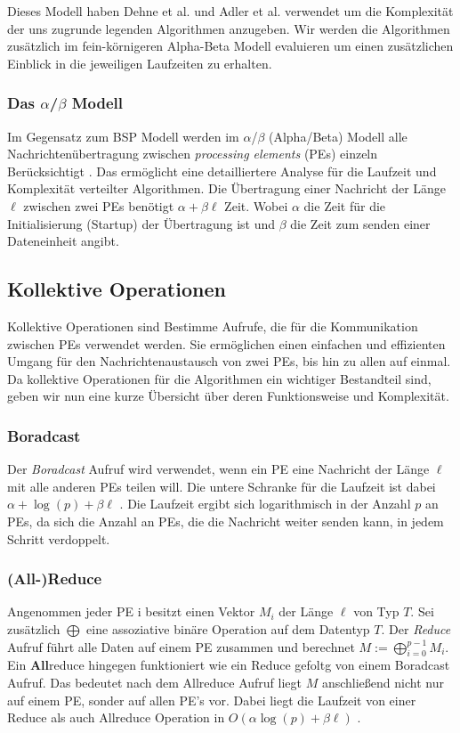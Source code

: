 Dieses Modell haben Dehne et al. \cite{dehne1998practical} und Adler et al. \cite{adler1998communication} verwendet um die Komplexität der uns zugrunde legenden Algorithmen anzugeben. Wir werden die Algorithmen zusätzlich im fein-körnigeren Alpha-Beta Modell evaluieren um einen zusätzlichen Einblick in die jeweiligen Laufzeiten zu erhalten.






\subsubsection{Das \boldmath$\alpha$/$\beta$ Modell}
Im Gegensatz zum BSP Modell werden im $\alpha$/$\beta$ (Alpha/Beta) Modell alle Nachrichtenübertragung zwischen \textit{processing elements} (PEs) einzeln Berücksichtigt \cite{sanders2019sequential}. Das ermöglicht eine detailliertere Analyse für die Laufzeit und Komplexität verteilter Algorithmen.
Die Übertragung einer Nachricht der Länge $\ell$ zwischen zwei PEs benötigt $\alpha + \beta \ell$ Zeit. Wobei $\alpha$ die Zeit für die Initialisierung (Startup) der Übertragung ist und $\beta$ die Zeit zum senden einer Dateneinheit angibt.


\subsection{Kollektive Operationen}
Kollektive Operationen sind Bestimme Aufrufe, die für die Kommunikation zwischen PEs verwendet werden.
Sie ermöglichen einen einfachen und effizienten Umgang für den Nachrichtenaustausch von zwei PEs, bis hin zu allen auf einmal. Da kollektive Operationen für die Algorithmen ein wichtiger Bestandteil sind, geben wir nun eine kurze Übersicht über deren Funktionsweise und Komplexität. 

\subsubsection{Boradcast}
Der \emph{Boradcast} Aufruf wird verwendet, wenn ein PE eine Nachricht der Länge $\ell$ mit alle anderen PEs teilen will. Die untere Schranke für die Laufzeit ist dabei $\alpha + \log(p) + \beta \ell$ \cite{sanders2009two}. 
Die Laufzeit ergibt sich logarithmisch in der Anzahl $p$ an PEs, da sich die Anzahl an PEs, die die Nachricht weiter senden kann, in jedem Schritt verdoppelt.

\subsubsection{(All-)Reduce}
Angenommen jeder PE i besitzt einen Vektor $M_i$ der Länge $\ell$ von Typ $T$. Sei zusätzlich $\bigoplus$ eine assoziative binäre Operation auf dem Datentyp $T$.
Der \emph{Reduce} Aufruf führt alle Daten auf einem PE zusammen und berechnet $M := \bigoplus_{i=0}^{p-1} M_i$. Ein \textbf{All}reduce hingegen funktioniert  wie ein Reduce gefoltg von einem Boradcast Aufruf.
Das bedeutet nach dem Allreduce Aufruf liegt  $M$ anschließend nicht nur auf einem PE, sonder auf allen PE's vor. Dabei liegt die Laufzeit von einer Reduce als auch Allreduce Operation in $O(\alpha \log(p) + \beta \ell)$ \cite{sanders2009two}.
